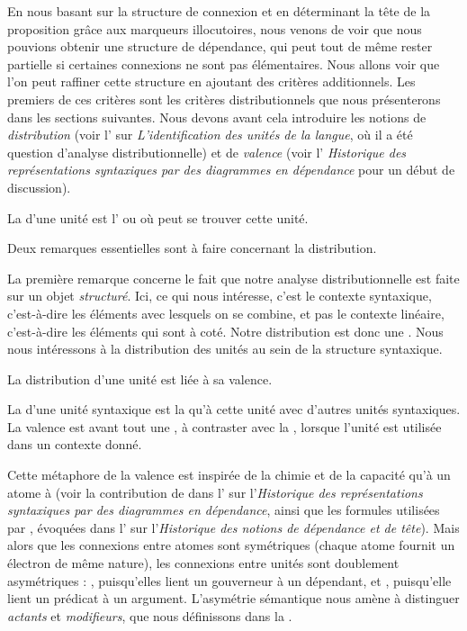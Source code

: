 En nous basant sur la structure de connexion et en déterminant la tête de la proposition grâce aux marqueurs illocutoires, nous venons de voir que nous pouvions obtenir une structure de dépendance, qui peut tout de même rester partielle si certaines connexions ne sont pas élémentaires. Nous allons voir que l’on peut raffiner cette structure en ajoutant des critères additionnels. Les premiers de ces critères sont les critères distributionnels que nous présenterons dans les sections suivantes. Nous devons avant cela introduire les notions de \textit{distribution} (voir l' sur \textit{L’identification des unités de la langue}, où il a été question d’analyse distributionnelle) et de \textit{valence} (voir l' \textit{Historique des représentations syntaxiques par des diagrammes en dépendance} pour un début de discussion).

{La  d’une unité est l’ ou  où peut se trouver cette unité.}

Deux remarques essentielles sont à faire concernant la distribution.

La première remarque concerne le fait que notre analyse distributionnelle est faite sur un objet \textit{structuré}. Ici, ce qui nous intéresse, c’est le contexte syntaxique, c'est-à-dire les éléments avec lesquels on se combine, et pas le contexte linéaire, c'est-à-dire les éléments qui sont à coté. Notre distribution est donc
une . Nous nous intéressons à la distribution des unités au sein de la structure syntaxique.

La distribution d'une unité est liée à sa valence.

{La  d’une unité syntaxique est la  qu’à cette unité  avec d’autres unités syntaxiques. La valence est avant tout une , à contraster avec la , lorsque l’unité est utilisée dans un contexte donné.}

Cette métaphore de la valence est inspirée de la chimie et de la capacité qu’à un atome à  (voir la contribution de \citet{peirce1897logic} dans l’ sur l'\textit{Historique des représentations syntaxiques par des diagrammes en dépendance}, ainsi que les formules utilisées par \citet{jespersen1937analytic}, évoquées dans l’ sur l'\textit{Historique des notions de dépendance et de tête}). Mais alors que les connexions entre atomes sont symétriques (chaque atome fournit un électron de même nature), les connexions entre unités sont doublement asymétriques : , puisqu’elles lient un gouverneur à un dépendant, et , puisqu’elle lient un prédicat à un argument. L'asymétrie sémantique nous amène à distinguer \textit{actants} et \textit{modifieurs}, que nous définissons dans la .

